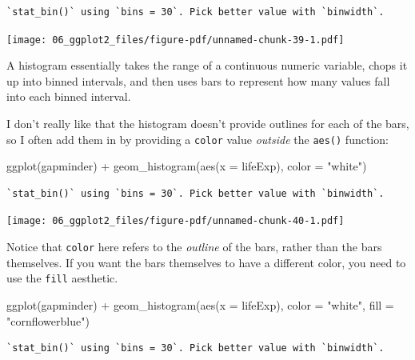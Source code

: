 \documentclass[
  letterpaper,
  DIV=11,
  numbers=noendperiod]{scrreprt}
\newenvironment{Shaded}{\begin{snugshade}}{\end{snugshade}}
\newcommand{\AttributeTok}[1]{\textcolor[rgb]{0.40,0.45,0.13}{#1}}
\newcommand{\FunctionTok}[1]{\textcolor[rgb]{0.28,0.35,0.67}{#1}}
\newcommand{\NormalTok}[1]{\textcolor[rgb]{0.00,0.23,0.31}{#1}}
\newcommand{\SpecialCharTok}[1]{\textcolor[rgb]{0.37,0.37,0.37}{#1}}
\newcommand{\StringTok}[1]{\textcolor[rgb]{0.13,0.47,0.30}{#1}}
\begin{document}
\begin{verbatim}
`stat_bin()` using `bins = 30`. Pick better value with `binwidth`.
\end{verbatim}

\texttt{[image: 06\_ggplot2\_files/figure-pdf/unnamed-chunk-39-1.pdf]}

A histogram essentially takes the range of a continuous numeric
variable, chops it up into binned intervals, and then uses bars to
represent how many values fall into each binned interval.

I don't really like that the histogram doesn't provide outlines for each
of the bars, so I often add them in by providing a \texttt{color} value
\emph{outside} the \texttt{aes()} function:

\begin{Shaded}
\begin{Highlighting}[]
\FunctionTok{ggplot}\NormalTok{(gapminder) }\SpecialCharTok{+} 
  \FunctionTok{geom\_histogram}\NormalTok{(}\FunctionTok{aes}\NormalTok{(}\AttributeTok{x =}\NormalTok{ lifeExp), }
                 \AttributeTok{color =} \StringTok{"white"}\NormalTok{)}
\end{Highlighting}
\end{Shaded}

\begin{verbatim}
`stat_bin()` using `bins = 30`. Pick better value with `binwidth`.
\end{verbatim}

\texttt{[image: 06\_ggplot2\_files/figure-pdf/unnamed-chunk-40-1.pdf]}

Notice that \texttt{color} here refers to the \emph{outline} of the
bars, rather than the bars themselves. If you want the bars themselves
to have a different color, you need to use the \texttt{fill} aesthetic.

\begin{Shaded}
\begin{Highlighting}[]
\FunctionTok{ggplot}\NormalTok{(gapminder) }\SpecialCharTok{+} 
  \FunctionTok{geom\_histogram}\NormalTok{(}\FunctionTok{aes}\NormalTok{(}\AttributeTok{x =}\NormalTok{ lifeExp), }
                 \AttributeTok{color =} \StringTok{"white"}\NormalTok{,}
                 \AttributeTok{fill =} \StringTok{"cornflowerblue"}\NormalTok{)}
\end{Highlighting}
\end{Shaded}

\begin{verbatim}
`stat_bin()` using `bins = 30`. Pick better value with `binwidth`.
\end{verbatim}
\end{document}
